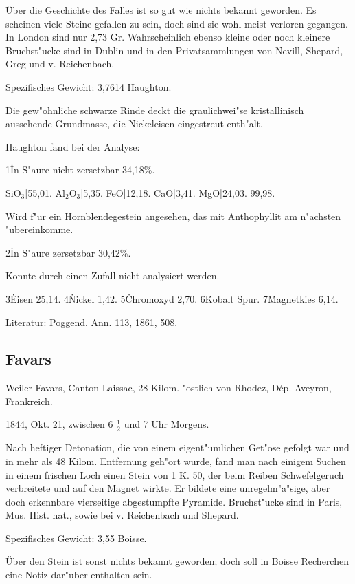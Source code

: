 \documentclass[a4paper, 11pt, oneside]{article}
\begin{document}
Über die Geschichte des Falles ist so gut wie nichts bekannt geworden. Es scheinen viele Steine gefallen zu sein, doch sind sie wohl meist verloren gegangen. In London sind nur 2,73 Gr. Wahrscheinlich ebenso kleine oder noch kleinere Bruchst"ucke sind in Dublin und in den Privatsammlungen von Nevill, Shepard, Greg und v. Reichenbach.

Spezifisches Gewicht: 3,7614 Haughton.

Die gew"ohnliche schwarze Rinde deckt die graulichwei"se kristallinisch aussehende Grundmasse, die Nickeleisen eingestreut enth"alt.

Haughton fand bei der Analyse:

1\. In S"aure nicht zersetzbar 34,18\%.

SiO$_{3}$|55,01.  
Al$_{2}$O$_{3}$|5,35.  
FeO|12,18.  
CaO|3,41.  
MgO|24,03.  
99,98. 

Wird f"ur ein Hornblendegestein angesehen, das mit Anthophyllit am n"achsten "ubereinkomme.

2\. In S"aure zersetzbar 30,42\%.

Konnte durch einen Zufall nicht analysiert werden.

3\. Eisen 25,14.  
4\. Nickel 1,42.  
5\. Chromoxyd 2,70.  
6\. Kobalt Spur.  
7\. Magnetkies 6,14.

Literatur: Poggend. Ann. 113, 1861, 508.

\subsection{Favars}

Weiler Favars, Canton Laissac, 28 Kilom. "ostlich von Rhodez, Dép. Aveyron, Frankreich.

1844, Okt. 21, zwischen 6 $\frac{1}{2}$ und 7 Uhr Morgens.

Nach heftiger Detonation, die von einem eigent"umlichen Get"ose gefolgt war und in mehr als 48 Kilom. Entfernung geh"ort wurde, fand man nach einigem Suchen in einem frischen Loch einen Stein von 1 K. 50, der beim Reiben Schwefelgeruch verbreitete und auf den Magnet wirkte. Er bildete eine unregelm"a"sige, aber doch erkennbare vierseitige abgestumpfte Pyramide. Bruchst"ucke sind in Paris, Mus. Hist. nat., sowie bei v. Reichenbach und Shepard.

Spezifisches Gewicht: 3,55 Boisse.

Über den Stein ist sonst nichts bekannt geworden; doch soll in Boisse Recherchen eine Notiz dar"uber enthalten sein.
\end{document}
